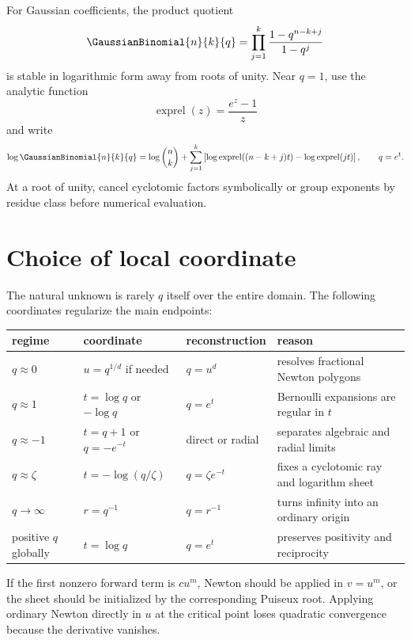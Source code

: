 \documentclass[11pt,letterpaper,oneside,openany]{book}
\theoremstyle{definition}
\theoremstyle{remark}
\begin{document}
For Gaussian coefficients, the product quotient
\[
 \GaussianBinomial{n}{k}{q}=\prod_{j=1}^{k}\frac{1-q^{n-k+j}}{1-q^j}
\]
is stable in logarithmic form away from roots of unity.  Near \(q=1\), use the
analytic function
\[
 \operatorname{exprel}(z)=\frac{e^z-1}{z}
\]
and write
\begin{equation}\label{eq:stable-gaussian-q1}
 \log\GaussianBinomial{n}{k}{q}
 =\log\binom nk+
 \sum_{j=1}^{k}
 \left[
  \log\operatorname{exprel}((n-k+j)t)
  -\log\operatorname{exprel}(jt)
 \right],
 \qquad q=e^t.
\end{equation}
At a root of unity, cancel cyclotomic factors symbolically or group exponents
by residue class before numerical evaluation.

\section{Choice of local coordinate}
The natural unknown is rarely \(q\) itself over the entire domain.  The
following coordinates regularize the main endpoints:
\begin{center}
\begin{tabularx}{0.93\textwidth}{@{}lllX@{}}
\toprule
regime & coordinate & reconstruction & reason\\
\midrule
\(q\approx0\) & \(u=q^{1/d}\) if needed & \(q=u^d\) & resolves fractional Newton polygons\\
\(q\approx1\) & \(t=\log q\) or \(-\log q\) & \(q=e^t\) & Bernoulli expansions are regular in \(t\)\\
\(q\approx-1\) & \(t=q+1\) or \(q=-e^{-t}\) & direct or radial & separates algebraic and radial limits\\
\(q\approx\zeta\) & \(t=-\log(q/\zeta)\) & \(q=\zeta e^{-t}\) & fixes a cyclotomic ray and logarithm sheet\\
\(q\to\infty\) & \(r=q^{-1}\) & \(q=r^{-1}\) & turns infinity into an ordinary origin\\
positive \(q\) globally & \(t=\log q\) & \(q=e^t\) & preserves positivity and reciprocity\\
\bottomrule
\end{tabularx}
\end{center}
If the first nonzero forward term is \(c u^m\), Newton should be applied in
\(v=u^m\), or the sheet should be initialized by the corresponding Puiseux
root.  Applying ordinary Newton directly in \(u\) at the critical point loses
quadratic convergence because the derivative vanishes.
\end{document}
